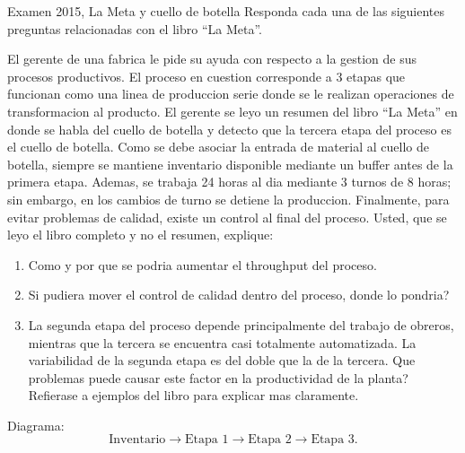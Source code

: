 \begin{enunciado}{Examen 2015, La Meta y cuello de botella}
Responda cada una de las siguientes preguntas relacionadas con el libro ``La Meta''.

El gerente de una fabrica le pide su ayuda con respecto a la gestion de sus procesos productivos. El proceso en cuestion corresponde a 3 etapas que funcionan como una linea de produccion serie donde se le realizan operaciones de transformacion al producto. El gerente se leyo un resumen del libro ``La Meta'' en donde se habla del cuello de botella y detecto que la tercera etapa del proceso es el cuello de botella. Como se debe asociar la entrada de material al cuello de botella, siempre se mantiene inventario disponible mediante un buffer antes de la primera etapa. Ademas, se trabaja 24 horas al dia mediante 3 turnos de 8 horas; sin embargo, en los cambios de turno se detiene la produccion. Finalmente, para evitar problemas de calidad, existe un control al final del proceso. Usted, que se leyo el libro completo y no el resumen, explique:

\begin{enumerate}[label=\alph*)]
  \item Como y por que se podria aumentar el throughput del proceso.
  \item Si pudiera mover el control de calidad dentro del proceso, donde lo pondria?
  \item La segunda etapa del proceso depende principalmente del trabajo de obreros, mientras que la tercera se encuentra casi totalmente automatizada. La variabilidad de la segunda etapa es del doble que la de la tercera. Que problemas puede causar este factor en la productividad de la planta? Refierase a ejemplos del libro para explicar mas claramente.
\end{enumerate}

Diagrama:
\[
  \text{Inventario}\rightarrow \text{Etapa 1}\rightarrow \text{Etapa 2}\rightarrow \text{Etapa 3}.
\]
\end{enunciado}

